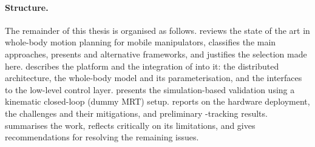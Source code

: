 \paragraph{Structure.}
The remainder of this thesis is organised as follows.
 reviews the state of the art in whole-body motion planning
for mobile manipulators, classifies the main approaches, presents
\ocs{} and alternative frameworks, and justifies the selection made here.
 describes the \hero{} platform and the integration
of \ocs{} into it: the distributed architecture, the whole-body model and
its parameterisation, and the interfaces to the low-level control layer.
 presents the simulation-based validation using a
kinematic closed-loop (dummy MRT) setup.  reports on
the hardware deployment, the challenges and their mitigations, and
preliminary \ee{}-tracking results.  summarises the
work, reflects critically on its limitations, and gives recommendations
for resolving the remaining issues.
